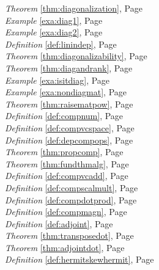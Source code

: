 \begin{multicols}{3}
\begin{center}
      \textit{Theorem} \ref{thm:diagonalization}, Page \pageref{thm:diagonalization} \\
      \textit{Example} \ref{exa:diag1}, Page \pageref{exa:diag1} \\
      \textit{Example} \ref{exa:diag2}, Page \pageref{exa:diag2} \\
      \textit{Definition} \ref{def:linindep}, Page \pageref{def:linindep} \\
      \textit{Theorem} \ref{thm:diagonalizability}, Page \pageref{thm:diagonalizability} \\
      \textit{Theorem} \ref{thm:diagandrank}, Page \pageref{thm:diagandrank} \\
      \textit{Example} \ref{exa:isitdiag}, Page \pageref{exa:isitdiag} \\
      \textit{Example} \ref{exa:nondiagmat}, Page \pageref{exa:nondiagmat} \\
      \textit{Theorem} \ref{thm:raisematpow}, Page \pageref{thm:raisematpow} \\
      \textit{Definition} \ref{def:compnum}, Page \pageref{def:compnum} \\
      \textit{Definition} \ref{def:compvcspace}, Page \pageref{def:compvcspace} \\
      \textit{Definition} \ref{def:depcompops}, Page \pageref{def:depcompops} \\
      \textit{Theorem} \ref{thm:propcomp}, Page \pageref{thm:propcomp} \\
      \textit{Theorem} \ref{thm:fundthmalg}, Page \pageref{thm:fundthmalg} \\
      \textit{Definition} \ref{def:compvcadd}, Page \pageref{def:compvcadd} \\
      \textit{Definition} \ref{def:compscalmult}, Page \pageref{def:compscalmult} \\
      \textit{Definition} \ref{def:compdotprod}, Page \pageref{def:compdotprod} \\
      \textit{Definition} \ref{def:compmagn}, Page \pageref{def:compmagn} \\
      \textit{Definition} \ref{def:adjoint}, Page \pageref{def:adjoint} \\
      \textit{Theorem} \ref{thm:transposedot}, Page \pageref{thm:transposedot} \\
      \textit{Theorem} \ref{thm:adjointdot}, Page \pageref{thm:adjointdot} \\
      \textit{Definition} \ref{def:hermitskewhermit}, Page \pageref{def:hermitskewhermit} \\

\end{center}
\end{multicols}
